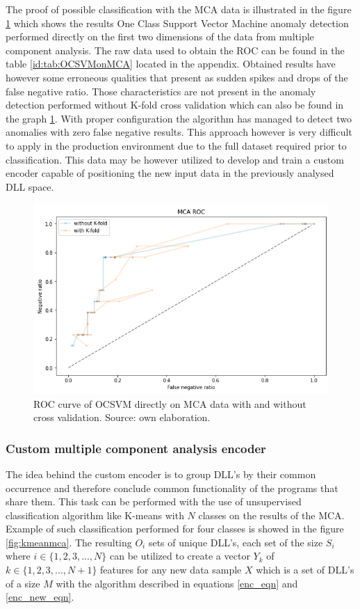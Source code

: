 \documentclass[a4paper,twoside,12pt]{book}
\begin{document}
The proof of possible classification with the MCA data is illustrated in the figure \ref{fig:mcaroc} which shows the 
results One Class Support Vector Machine anomaly detection performed directly on the first two dimensions 
of the data from multiple component analysis. The raw data used to obtain the ROC can be found in the table
\ref{id:tab:OCSVMonMCA} located in the appendix. Obtained results have however some erroneous qualities that
present as sudden spikes and drops of the false negative ratio. Those characteristics are not present in the 
anomaly detection performed without K-fold cross validation which can also be found in the graph \ref{fig:mcaroc}. 
With proper configuration the algorithm has managed to detect 
two anomalies with zero false negative results. This approach however is very difficult to apply in the 
production environment due to the full dataset required prior to classification. This data may be however 
utilized to develop and train a custom encoder capable of positioning the new input data in the previously 
analysed DLL space.  

 \begin{figure}
	\centering
	\includegraphics[scale=0.9]{images/MCAROCbothKFandNot.PNG}
	\caption{ROC curve of OCSVM directly on MCA data with and without cross validation. Source: own elaboration.}
	\label{fig:mcaroc}
 \end{figure}

\subsubsection{Custom multiple component analysis encoder}

The idea behind the custom encoder is to group DLL's by their common occurrence and therefore
conclude common functionality of the programs that share them. This task can be performed
with the use of unsupervised classification algorithm like K-means with $\mathit{N}$ classes 
on the results of the MCA. Example of such classification
performed for four classes is showed in the figure \ref{fig:kmeanmca}. The resulting 
$\mathit{O_{i}}$ sets of unique DLL's, each set of the size $\mathit{S_{i}}$  where 
$\mathit{i\in\{1, 2, 3,..., N\}}$  can be utilized to create a 
vector $\mathit{Y_{k}}$ of $\mathit{k\in\{1, 2, 3, ..., N + 1\}}$ features for any new 
data sample $\mathit{X}$ which is a set of DLL's of a size $\mathit{M}$ with the algorithm
described in equations \ref{enc_eqn} and \ref{enc_new_eqn}. 
\end{document}
